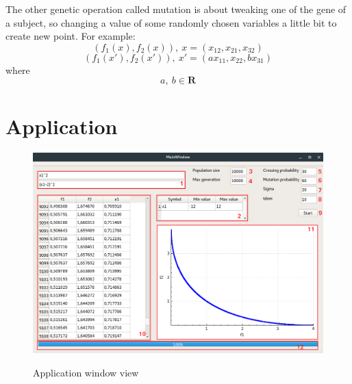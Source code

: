 \documentclass[11pt]{article}
\begin{document}
	The other genetic operation called mutation is about tweaking one of the gene of
	a subject, so changing a value of some randomly chosen variables a little bit to 
	create new point. For example:
	$$(f_{1}(x), f_{2}(x)),\ x=(x_{12}, x_{21}, x_{32})$$
	$$(f_{1}(x'), f_{2}(x')),\ x'=(ax_{11}, x_{22}, bx_{31})$$
	where
	$$a,\ b\in \boldsymbol{R}$$
	
	\newpage	
	\section{Application}
	
	\begin{figure}[H]
	\caption{Application window view}
	\centering
	\includegraphics[scale=0.35]{application}
	\label{fig:app_window}
	\end{figure}
	
\end{document}
